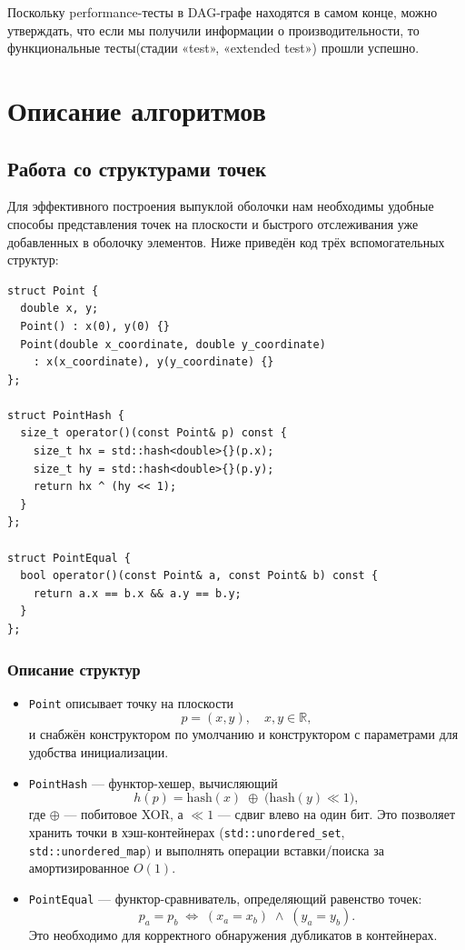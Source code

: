 \documentclass[12pt,a4paper]{article}
\begin{document}
Поскольку performance-тесты в DAG-графе находятся в самом конце, можно утверждать, что если мы получили информации о производительности, то функциональные тесты(стадии «test», «extended test») прошли успешно.

\section{Описание алгоритмов}
\subsection*{Работа со структурами точек}
Для эффективного построения выпуклой оболочки нам необходимы удобные способы представления точек на плоскости и быстрого отслеживания уже добавленных в оболочку элементов. Ниже приведён код трёх вспомогательных структур: 
\newpage
\begin{lstlisting}
struct Point {
  double x, y;
  Point() : x(0), y(0) {}
  Point(double x_coordinate, double y_coordinate)
    : x(x_coordinate), y(y_coordinate) {}
};

struct PointHash {
  size_t operator()(const Point& p) const {
    size_t hx = std::hash<double>{}(p.x);
    size_t hy = std::hash<double>{}(p.y);
    return hx ^ (hy << 1);
  }
};

struct PointEqual {
  bool operator()(const Point& a, const Point& b) const {
    return a.x == b.x && a.y == b.y;
  }
};
\end{lstlisting}

\subsubsection*{Описание структур}

\begin{itemize}
  \item \texttt{Point} описывает точку на плоскости 
    \[
      p = (x, y),\quad x,y \in \mathbb{R},
    \]
    и снабжён конструктором по умолчанию и конструктором с параметрами для удобства инициализации.
  
  \item \texttt{PointHash} — функтор-хешер, вычисляющий
    \[
      h(p) = \mathrm{hash}(x)\;\oplus\;\bigl(\mathrm{hash}(y)\ll 1\bigr),
    \]
    где \(\oplus\) — побитовое XOR, а \(\ll1\) — сдвиг влево на один бит. Это позволяет хранить точки в хэш-контейнерах (\texttt{std::unordered\_set}, \texttt{std::unordered\_map}) и выполнять операции вставки/поиска за амортизированное \(O(1)\).
  
  \item \texttt{PointEqual} — функтор­-сравниватель, определяющий равенство точек:
    \[
      p_a = p_b \;\Longleftrightarrow\; (x_a = x_b)\;\wedge\;(y_a = y_b).
    \]
    Это необходимо для корректного обнаружения дубликатов в контейнерах.
\end{itemize}
\end{document}
